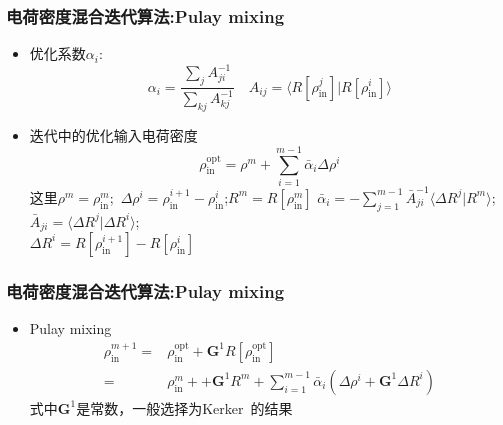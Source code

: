 \documentclass[cjk,slidestop,compress,mathserif,blue]{beamer}
\begin{document}
  \frame
  {
	  \frametitle{电荷密度混合迭代算法:\textrm{Pulay mixing}}
	  \begin{itemize}
		  \item 优化系数$\alpha_i$:
			  \begin{displaymath}
				  \alpha_i=\dfrac{\sum_jA_{ji}^{-1}}{\sum_{kj}A_{kj}^{-1}}\quad A_{ij}=\langle R[\rho_{\mathrm{in}}^j]|R[\rho_{\mathrm{in}}^i]\rangle
			  \end{displaymath}
		  \item 迭代中的优化输入电荷密度
			  \begin{displaymath}
				  \rho_{\mathrm{in}}^{\mathrm{opt}}=\rho^m+\sum_{i=1}^{m-1}\bar\alpha_i\Delta\rho^i
			  \end{displaymath}
			  这里$\rho^m=\rho_{\mathrm{in}}^m$;~$\Delta\rho^i=\rho_{\mathrm{in}}^{i+1}-\rho_{\mathrm{in}}^{i}$;$R^m=R[\rho_{\mathrm{in}}^m]$
			  $\bar\alpha_i=-\sum\limits_{j=1}^{m-1}\bar{A}_{ji}^{-1}\langle\Delta R^j|R^m\rangle$;~$\bar{A}_{ji}=\langle\Delta R^j|\Delta R^i\rangle$;\\$\Delta R^i=R[\rho_{\mathrm{in}}^{i+1}]-R[\rho_{\mathrm{in}}^{i}]$

	  \end{itemize}
  }

  \frame
  {
	  \frametitle{电荷密度混合迭代算法:\textrm{Pulay mixing}}
	  \begin{itemize}
		  \item \textrm{Pulay mixing}
			  \begin{displaymath}
				  \begin{aligned}
					  \rho_{\mathrm{in}}^{m+1}=&\rho_{\mathrm{in}}^{\mathrm{opt}}+\mathbf{G}^1R[\rho_{\mathrm{in}}^{\mathrm{opt}}]\\
					  =&\rho_{\mathrm{in}}^{m}++\mathbf{G}^1R^m+\sum_{i=1}^{m-1}\bar\alpha_i(\Delta\rho^i+\mathbf{G}^1\Delta R^i)
				  \end{aligned}
			  \end{displaymath}
			  式中$\mathbf{G}^1$是常数，一般选择为\textrm{Kerker~}的结果
	  \end{itemize}
  }
\end{document}
